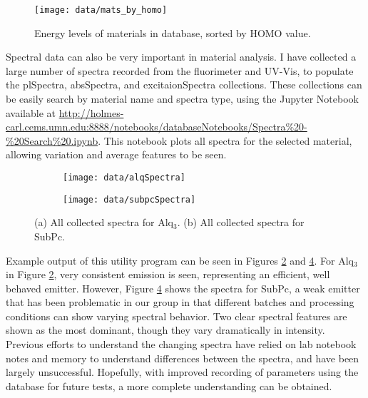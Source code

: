 \documentclass[../thesis.tex]{subfiles}
\begin{document}
\begin{figure}[ht]
\centering
\texttt{[image: data/mats\_by\_homo]}
\caption{Energy levels of materials in database, sorted by HOMO value.}
\label{fig:data_mats_By_homo}
\end{figure}

Spectral data can also be very important in material analysis.  
I have collected a large number of spectra recorded from the fluorimeter and UV-Vis, to populate the plSpectra, absSpectra, and excitaionSpectra collections.
These collections can be easily search by material name and spectra type, using the Jupyter Notebook available at \url{http://holmes-carl.cems.umn.edu:8888/notebooks/databaseNotebooks/Spectra\%20-\%20Search\%20.ipynb}.
This notebook plots all spectra for the selected material, allowing variation and average features to be seen.


\begin{figure}[ht]
\centering
    \begin{subfigure}{.4\textwidth}
    \texttt{[image: data/alqSpectra]}
    \caption{}
    \label{fig:data_alq}\par\vfill
    \end{subfigure}
    \begin{subfigure}{.4\textwidth}
    \texttt{[image: data/subpcSpectra]}
    \caption{}
    \label{fig:data_subpc}\par\vfill
    \end{subfigure}
\caption{  (a) All collected spectra for Alq$_3$.  (b) All collected spectra for SubPc.}
\end{figure}

Example output of this utility program can be seen in Figures \ref{fig:data_alq} and \ref{fig:data_subpc}.
For Alq$_3$ in Figure \ref{fig:data_alq}, very consistent emission is seen, representing an efficient, well behaved emitter.
However, Figure \ref{fig:data_subpc} shows the spectra for SubPc, a weak emitter that has been problematic in our group in that different batches and processing conditions can show varying spectral behavior.
Two clear spectral features are shown as the most dominant, though they vary dramatically in intensity.
Previous efforts to understand the changing spectra have relied on lab notebook notes and memory to understand differences between the spectra, and have been largely unsuccessful.
Hopefully, with improved recording of parameters using the database for future tests, a more complete understanding can be obtained.
\end{document}
